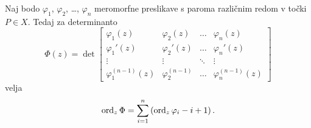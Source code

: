 \begin{lema}
Naj bodo $\varphi_1$, $\varphi_2$, \dots, $\varphi_n$ meromorfne
preslikave s paroma različnim redom v točki $P \in X$. Tedaj za
determinanto
\[
\Phi(z) = \det
\begin{bmatrix}
\varphi_1(z)    & \varphi_2(z)  & \dots  & \varphi_n(z)  \\
\varphi_1'(z)   & \varphi_2'(z) & \dots  & \varphi_n'(z) \\
\vdots          & \vdots        & \ddots & \vdots        \\
\varphi_1^{(n-1)}(z)            & \varphi_2^{(n-1)}      &
\dots                           & \varphi_n^{(n-1)}(z)
\end{bmatrix}
\]
velja
\[
\operatorname{ord}_z \Phi = \sum_{i=1}^n \left(\operatorname{ord}_z \varphi_i - i + 1\right).
\]
\end{lema}

